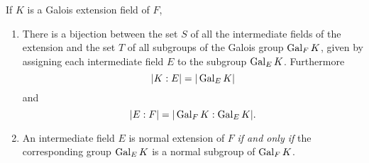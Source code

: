 \begin{theorem}
    If $K$ is a Galois extension field of $F$, 
    \begin{enumerate}
        \item There is a bijection between the set $S$ of all the intermediate fields of the extension and 
            the set $T$ of all subgroups of the Galois group $\operatorname{Gal}_F K$, given by assigning each intermediate 
            field $E$ to the subgroup $\operatorname{Gal}_E K$. Furthermore
            \[
                |K:E| = |\operatorname{Gal}_E K|
            \]
            and 
            \[
                |E:F| = |\operatorname{Gal}_F K : \operatorname{Gal}_E K|.
            \]
        
        \item An intermediate field $E$ is normal extension of $F$ \textit{if and only if} the 
            corresponding group $\operatorname{Gal}_E K$ is a normal subgroup of $\operatorname{Gal}_F K$.
    \end{enumerate}
\end{theorem}
